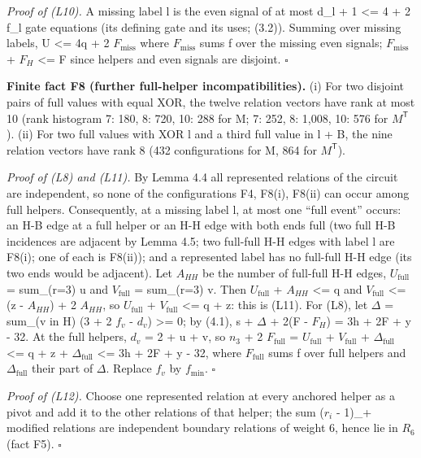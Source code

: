 \emph{Proof of (L10).} A missing label l is the even signal of at most d\_l + 1 \textless= 4 + 2 f\_l gate equations (its defining gate and its uses; (3.2)). Summing over missing labels, U \textless= 4q + 2 \(F_{\mathrm{miss}}\) where \(F_{\mathrm{miss}}\) sums f over the missing even signals; \(F_{\mathrm{miss}}\) + \(F_H\) \textless= F since helpers and even signals are disjoint. \(\square\)

\textbf{Finite fact F8 (further full-helper incompatibilities).} (i) For two disjoint pairs of full values with equal XOR, the twelve relation vectors have rank at most 10 (rank histogram 7: 180, 8: 720, 10: 288 for M; 7: 252, 8: 1,008, 10: 576 for \(M^{\mathsf T}\)). (ii) For two full values with XOR l and a third full value in l + B, the nine relation vectors have rank 8 (432 configurations for M, 864 for \(M^{\mathsf T}\)).

\emph{Proof of (L8) and (L11).} By Lemma 4.4 all represented relations of the circuit are independent, so none of the configurations F4, F8(i), F8(ii) can occur among full helpers. Consequently, at a missing label l, at most one ``full event'' occurs: an H-B edge at a full helper or an H-H edge with both ends full (two full H-B incidences are adjacent by Lemma 4.5; two full-full H-H edges with label l are F8(i); one of each is F8(ii)); and a represented label has no full-full H-H edge (its two ends would be adjacent). Let \(A_{HH}\) be the number of full-full H-H edges, \(U_{\mathrm{full}}\) = sum\_(r=3) u and \(V_{\mathrm{full}}\) = sum\_(r=3) v. Then \(U_{\mathrm{full}}\) + \(A_{HH}\) \textless= q and \(V_{\mathrm{full}}\) \textless= (z - \(A_{HH}\)) + 2 \(A_{HH}\), so \(U_{\mathrm{full}}\) + \(V_{\mathrm{full}}\) \textless= q + z: this is (L11). For (L8), let \(\Delta\) = sum\_(v in H) (3 + 2 \(f_v\) - \(d_v\)) \textgreater= 0; by (4.1), s + \(\Delta\) + 2(F - \(F_H\)) = 3h + 2F + y - 32. At the full helpers, \(d_v\) = 2 + u + v, so \(n_3\) + 2 \(F_{\mathrm{full}}\) = \(U_{\mathrm{full}}\) + \(V_{\mathrm{full}}\) + \(\Delta_{\mathrm{full}}\) \textless= q + z + \(\Delta_{\mathrm{full}}\) \textless= 3h + 2F + y - 32, where \(F_{\mathrm{full}}\) sums f over full helpers and \(\Delta_{\mathrm{full}}\) their part of \(\Delta\). Replace \(f_v\) by \(f_{\min}\). \(\square\)

\emph{Proof of (L12).} Choose one represented relation at every anchored helper as a pivot and add it to the other relations of that helper; the sum (\(r_i\) - 1)\_+ modified relations are independent boundary relations of weight 6, hence lie in \(R_6\) (fact F5). \(\square\)

